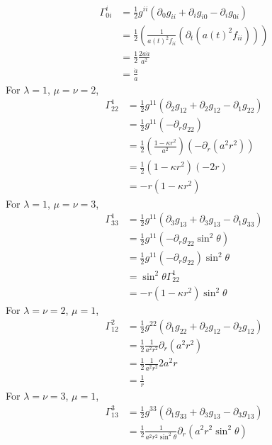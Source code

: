 \begin{enumerate}[label=(\alph*)]
		\begin{align*}
		\Gamma^i_{0i}  	& = \frac{1}{2} g^{ii} ( \partial_0 g_{ii} + \partial_i g_{i0} - \partial_i g_{0i} ) 	\\
						& = \frac{1}{2} (\frac{1}{a(t)^2f_{ii}} (\partial_t(a(t)^2f_{ii})) )\\
						& = \frac{1}{2} \frac{2a\dot{a}}{a^2} \\
						& = \frac{\dot{a}}{a}
		\end{align*}		
	For $\lambda=1$, $\mu=\nu=2$,
		\begin{align*}
		\Gamma^1_{22}  	& = \frac{1}{2} g^{11} ( \partial_2 g_{12} + \partial_2 g_{12} - \partial_1 g_{22}) 	\\
						& = \frac{1}{2} g^{11} (- \partial_r g_{22}) \\
						& =	\frac{1}{2} (\frac{1-\kappa r^2}{a^2} )(-\partial_r (a^2 r^2)) \\
						& = \frac{1}{2} (1-\kappa r^2)(-2r) \\
						& = -r(1-\kappa r^2)
		\end{align*}		
	For $\lambda=1$, $\mu=\nu=3$,
		\begin{align*}
		\Gamma^1_{33}  	& = \frac{1}{2} g^{11} ( \partial_3 g_{13} + \partial_3 g_{13} - \partial_1 g_{33}) 	\\
						& = \frac{1}{2} g^{11} (- \partial_r g_{22}\sin^2{\theta})\\
						& = \frac{1}{2} g^{11} (- \partial_r g_{22}) \sin^2{\theta} \\
						& = \sin^2{\theta} \Gamma^1_{22}\\
						& = -r(1-\kappa r^2)\sin^2{\theta}
		\end{align*}		
	For $\lambda=\nu=2$, $\mu=1$,
		\begin{align*}
		\Gamma^2_{12}  	& = \frac{1}{2} g^{22} ( \partial_1 g_{22} + \partial_2 g_{12} - \partial_2 g_{12}) 	\\
						& = \frac{1}{2} \frac{1}{a^2 r^2}  \partial_r (a^2 r^2 )\\
						& = \frac{1}{2} \frac{1}{a^2 r^2} 2a^2 r \\
						& =  \frac{1}{r}
		\end{align*}		
	For $\lambda=\nu=3$, $\mu=1$,
		\begin{align*}
		\Gamma^3_{13}  	& = \frac{1}{2} g^{33} ( \partial_1 g_{33} + \partial_3 g_{13} - \partial_3 g_{13}) 	\\
						& = \frac{1}{2} \frac{1}{a^2 r^2 \sin^2{\theta} }  \partial_r (a^2 r^2 \sin^2{\theta})\\

\end{align*}
\end{enumerate}
